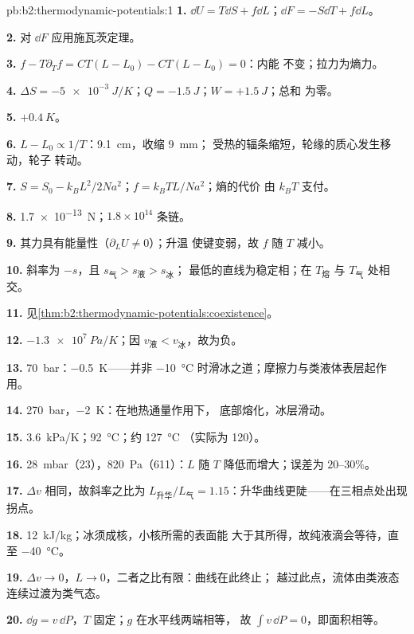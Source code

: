 \begin{solution}{pb:b2:thermodynamic-potentials:1}
\textbf{1.} $\dd U = T\dd S + f\dd L$；$\dd F = -S\dd T + f\dd L$。

\textbf{2.} 对 $\dd F$ 应用施瓦茨定理。

\textbf{3.} $f - T\partial_Tf = CT(L - L_0) - CT(L - L_0) = 0$：内能
不变；拉力为熵力。

\textbf{4.} $\Delta S = \qty{-5e-3}{J/K}$；$Q = \qty{-1.5}{J}$；$W = +\qty{1.5}{J}$；总和
为零。

\textbf{5.} $+\qty{0.4}{K}$。

\textbf{6.} $L - L_0 \propto 1/T$：\qty{9.1}{cm}，收缩 \qty{9}{mm}；
受热的辐条缩短，轮缘的质心发生移动，轮子
转动。

\textbf{7.} $S = S_0 - k_BL^2/2Na^2$；$f = k_BTL/Na^2$；熵的代价
由 $k_BT$ 支付。

\textbf{8.} \qty{1.7e-13}{N}；$1.8 \times 10^{14}$ 条链。

\textbf{9.} 其力具有能量性（$\partial_LU \ne 0$）；升温
使键变弱，故 $f$ 随 $T$ 减小。

\textbf{10.} 斜率为 $-s$，且 $s_{\text{气}} > s_{\text{液}} > s_{\text{冰}}$；
最低的直线为稳定相；在 $T_{\text{熔}}$ 与 $T_{\text{气}}$ 处相交。

\textbf{11.} 见\cref{thm:b2:thermodynamic-potentials:coexistence}。

\textbf{12.} $\qty{-1.3e7}{Pa/K}$；因 $v_{\text{液}} < v_{\text{冰}}$，故为负。

\textbf{13.} \qty{70}{bar}：\qty{-0.5}{K}——并非
\qty{-10}{\celsius} 时滑冰之道；摩擦力与类液体表层起作用。

\textbf{14.} \qty{270}{bar}，\qty{-2}{K}：在地热通量作用下，
底部熔化，冰层滑动。

\textbf{15.} \qty{3.6}{kPa/K}；\qty{92}{\celsius}；约 \qty{127}{\celsius}
（实际为 \qty{120}{}）。

\textbf{16.} \qty{28}{mbar}（\qty{23}{}），\qty{820}{Pa}（\qty{611}{}）：$L$ 随 $T$
降低而增大；误差为 $20$--$30\%$。

\textbf{17.} $\Delta v$ 相同，故斜率之比为 $L_{\text{升华}}/L_{\text{气}}
= 1.15$：升华曲线更陡——在三相点处出现拐点。

\textbf{18.} \qty{12}{kJ/kg}；冰须成核，小核所需的表面能
大于其所得，故纯液滴会等待，直至
\qty{-40}{\celsius}。

\textbf{19.} $\Delta v \to 0$，$L \to 0$，二者之比有限：曲线在此终止；
越过此点，流体由类液态连续过渡为类气态。

\textbf{20.} $\dd g = v\,\dd P$，$T$ 固定；$g$ 在水平线两端相等，
故 $\int v\,\dd P = 0$，即面积相等。


\end{solution}
